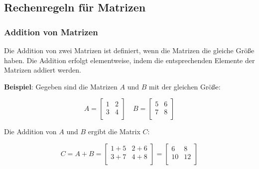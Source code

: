 \documentclass{beamer}
\begin{document}
\subsection{Rechenregeln für Matrizen}
\begin{frame}
  \frametitle{Addition von Matrizen}
  
  Die Addition von zwei Matrizen ist definiert, wenn die Matrizen die gleiche Größe haben. Die Addition erfolgt elementweise, indem die entsprechenden Elemente der Matrizen addiert werden.
  
  \vspace{0.3cm}
  
  \textbf{Beispiel}: Gegeben sind die Matrizen $A$ und $B$ mit der gleichen Größe:
  
  \[
  A = \begin{bmatrix}
    1 & 2 \\
    3 & 4 \\
  \end{bmatrix}
  \quad
  B = \begin{bmatrix}
    5 & 6 \\
    7 & 8 \\
  \end{bmatrix}
  \]
  
  Die Addition von $A$ und $B$ ergibt die Matrix $C$:
  
  \[
  C = A + B = \begin{bmatrix}
    1+5 & 2+6 \\
    3+7 & 4+8 \\
  \end{bmatrix}
  = \begin{bmatrix}
    6 & 8 \\
    10 & 12 \\
  \end{bmatrix}
  \]
\end{frame}
\end{document}
